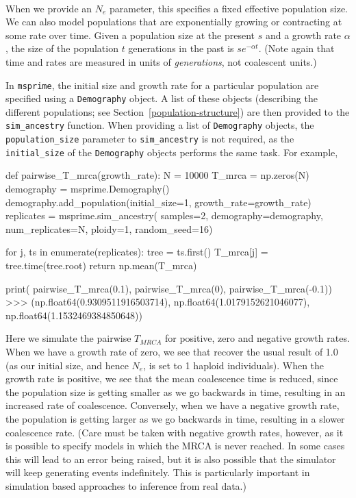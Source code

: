 \documentclass[graybox]{svmult}
\newcommand{\msprime}[0]{\texttt{msprime}}
\begin{document}
\label{exponentially-growingshrinking-populations} \

When we provide an \(N_e\) parameter, this specifies a fixed effective
population size. We can also model populations that are exponentially
growing or contracting at some rate over time. Given a population size
at the present \(s\) and a growth rate \(\alpha\), the size of the
population \(t\) generations in the past is $s e^{-\alpha t}$. (Note
again that time and rates are measured in units of \emph{generations},
not coalescent units.)

In \msprime, the initial size and growth rate for a particular population
are specified using a \texttt{Demography} object. A list
of these objects (describing the different populations; see
Section~\ref{population-structure}) are then provided to the
\texttt{sim\_ancestry}
function. When providing a list of
\texttt{Demography} objects, the \texttt{population\_size} parameter to
\texttt{sim\_ancestry} is not required, as the \texttt{initial\_size} of the
\texttt{Demography} objects performs the same task. For example,

\begin{pythoncode}
def pairwise_T_mrca(growth_rate):
    N = 10000
    T_mrca = np.zeros(N)
    demography = msprime.Demography()
    demography.add_population(initial_size=1,
                              growth_rate=growth_rate)
    replicates = msprime.sim_ancestry(
        samples=2,
        demography=demography,
        num_replicates=N,
        ploidy=1,
        random_seed=16)

    for j, ts in enumerate(replicates):
        tree = ts.first()
        T_mrca[j] = tree.time(tree.root)
    return np.mean(T_mrca)

print(
    pairwise_T_mrca(0.1), pairwise_T_mrca(0),
    pairwise_T_mrca(-0.1))
>>> (np.float64(0.9309511916503714),
     np.float64(1.0179152621046077),
     np.float64(1.1532469384850648))
\end{pythoncode}

    Here we simulate the pairwise \(T_{MRCA}\) for positive, zero and
negative growth rates. When we have a growth rate of zero, we see that
recover the usual result of 1.0 (as our initial size, and hence \(N_e\),
is set to 1 haploid individuals). When the growth rate is positive, we see that the
mean coalescence time is reduced, since the population size is getting
smaller as we go backwards in time, resulting in an increased rate of
coalescence. Conversely, when we have a negative growth rate, the
population is getting larger as we go backwards in time, resulting in a
slower coalescence rate. (Care must be taken with negative growth rates,
however, as it is possible to specify models in which the MRCA is never
reached. In some cases this will lead to an error being raised, but it
is also possible that the simulator will keep generating events
indefinitely. This is particularly important in simulation based
approaches to inference from real data.)
\end{document}
